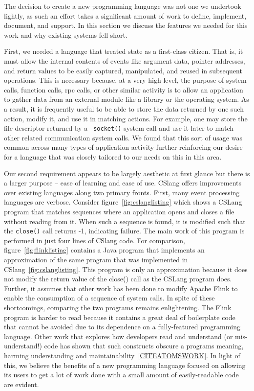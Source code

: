 The decision to create a new programming language was not one we
undertook lightly,
as such an effort takes
a significant amount of work
to define,
implement, document, and support.
In this section we discuss the features we needed for this work
and why existing systems fell short.

First, we needed a language that treated state as a first-class citizen.
That is, it must allow the internal contents of events like argument data,
pointer addresses, and return values to be easily captured, manipulated, and
reused in subsequent operations.
This is necessary because,
at a very high level,
the purpose of system calls,
function calls,
rpc calls,
or other similar activity
is to allow an application
to gather data from an external module like a library or the operating
system.
As a result, it is frequently useful to be able to store the data returned by
one such action, modify it, and use it in matching actions.
For example, one may store the file descriptor returned by a {\tt
socket()} system call and use it later to match other related
communication system calls.
We found that this sort of usage was common across many types of
application activity further reinforcing our desire for a language that was
closely tailored to our needs on this in this area.




Our second requirement appears to be largely aesthetic at first glance
but there is a
larger purpose -- ease of learning and ease of use.  CSlang offers
improvements over existing languages along two primary fronts.
First, many event processing languages are verbose.
Consider figure~\ref{fig:cslanglisting}  which shows a
CSLang program that matches sequences where an application opens and closes
a file without reading from it.  When such a sequence is found, it is
modified such that the {\tt close()} call returns -1, indicating failure.
The main work of this program is performed in just four lines of CSlang
code.  For comparison, figure~\ref{fig:flinklisting} contains a Java program that
implements an approximation of the same program that was implemented in
CSlang~\ref{fig:cslanglisting}.
This program is only an approximation because it does not modify the return
value of the close() call as the CSLang program does.  Further, it assumes
that other work has been done to modify Apache Flink to enable the
consumption of a sequence of system calls.
In spite of these shortcomings, comparing the two programs remains
enlightening.  The Flink program is harder to read because it contains a
great deal of boilerplate code
that cannot be avoided due to its dependence on a fully-featured
programming language.  Other work that explores how developers read and
understand (or mis-understand!) code has shown that such constructs obscure
a programs meaning, harming understanding and
maintainability~\ref{CITEATOMSWORK}.
In light of this, we believe the benefits of a
new programming language
focused on allowing its users to get a lot of work done
with a small amount of easily-readable code are evident.

